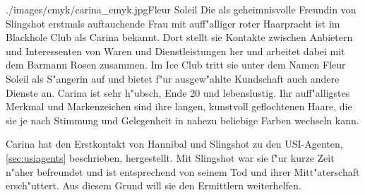 
\begin{sideimagebox}[r]{0.6}{./images/cmyk/carina_cmyk.jpg}{Fleur Soleil}
    Die als geheimnisvolle Freundin von Slingshot erstmals auftauchende Frau mit auff"alliger roter Haarpracht ist im Blackhole Club als Carina bekannt. Dort stellt sie Kontakte zwischen Anbietern und Interessenten von Waren und Dienstleistungen her und arbeitet dabei mit dem Barmann Rosen zusammen. Im Ice Club tritt sie unter dem Namen Fleur Soleil als S"angerin auf und bietet f"ur ausgew"ahlte Kundschaft auch andere Dienste an. Carina ist sehr h"ubsch, Ende 20 und lebenslustig. Ihr auff"alligstes Merkmal und Markenzeichen sind ihre langen, kunstvoll geflochtenen Haare, die sie je nach Stimmung und Gelegenheit in nahezu beliebige Farben wechseln kann.

    Carina hat den Erstkontakt von Hannibal und Slingshot zu den USI-Agenten, \cref{sec:usiagents} beschrieben, hergestellt. Mit Slingshot war sie f"ur kurze Zeit n"aher befreundet und ist entsprechend von seinem Tod und ihrer Mitt"aterschaft ersch"uttert. Aus diesem Grund will sie den Ermittlern weiterhelfen.
\end{sideimagebox}
\vfill\pagebreak
